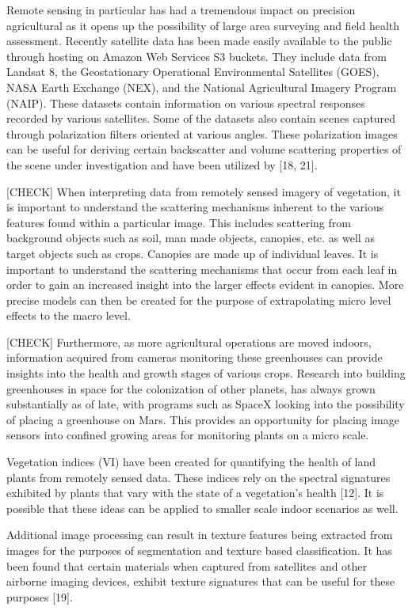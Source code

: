 Remote sensing in particular has had a tremendous impact on precision agricultural as it opens up the possibility of large area surveying and field health assessment.  Recently satellite data has been made easily available to the public through hosting on Amazon Web Services S3 buckets.  They include data from Landsat 8, the Geostationary Operational Environmental Satellites (GOES), NASA Earth Exchange (NEX), and the National Agricultural Imagery Program (NAIP).  These datasets contain information on various spectral responses recorded by various satellites.  Some of the datasets also contain scenes captured through polarization filters oriented at various angles. These polarization images can be useful for deriving certain backscatter and volume scattering properties of the scene under investigation and have been utilized by [18, 21].

[CHECK] When interpreting data from remotely sensed imagery of vegetation, it is important to understand the scattering mechanisms inherent to the various features found within a particular image.  This includes scattering from background objects such as soil, man made objects, canopies, etc. as well as target objects such as crops. Canopies are made up of individual leaves.  It is important to understand the scattering mechanisms that occur from each leaf in order to gain an increased insight into the larger effects evident in canopies. More precise models can then be created for the purpose of extrapolating micro level effects to the macro level.

[CHECK] Furthermore, as more agricultural operations are moved indoors, information acquired from cameras monitoring these greenhouses can provide insights into the health and growth stages of various crops. Research into building greenhouses in space for the colonization of other planets, has always grown substantially as of late, with programs such as SpaceX looking into the possibility of placing a greenhouse on Mars.  This provides an opportunity for placing image sensors into confined growing areas for monitoring plants on a micro scale.

Vegetation indices (VI) have been created for quantifying the health of land plants from remotely sensed data.  These indices rely on the spectral signatures exhibited by plants that vary with the state of a vegetation’s health [12].  It is possible that these ideas can be applied to smaller scale indoor scenarios as well.

Additional image processing can result in texture features being extracted from images for the purposes of segmentation and texture based classification.  It has been found that certain materials when captured from satellites and other airborne imaging devices, exhibit texture signatures that can be useful for these purposes [19].

